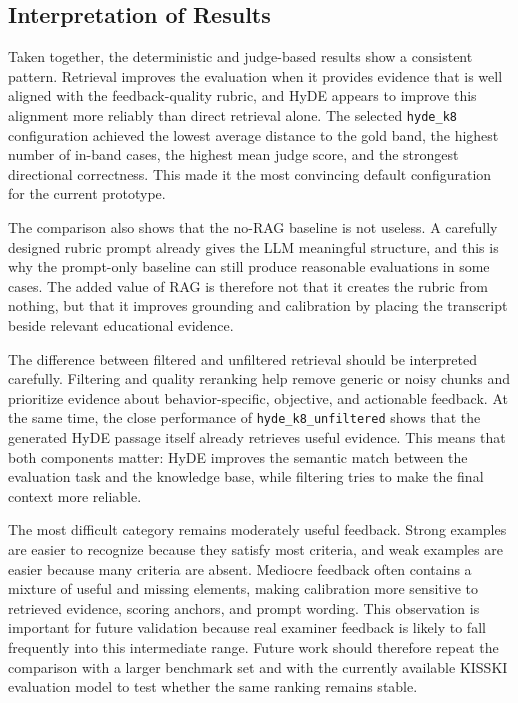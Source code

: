 \subsection{Interpretation of Results}
Taken together, the deterministic and judge-based results show a consistent
pattern. Retrieval improves the evaluation when it provides evidence that is
well aligned with the feedback-quality rubric, and HyDE appears to improve this
alignment more reliably than direct retrieval alone. The selected
\texttt{hyde\_k8} configuration achieved the lowest average distance to the
gold band, the highest number of in-band cases, the highest mean judge score,
and the strongest directional correctness. This made it the most convincing
default configuration for the current prototype.

The comparison also shows that the no-RAG baseline is not useless. A carefully
designed rubric prompt already gives the LLM meaningful structure, and this is
why the prompt-only baseline can still produce reasonable evaluations in some
cases. The added value of RAG is therefore not that it creates the rubric from
nothing, but that it improves grounding and calibration by placing the
transcript beside relevant educational evidence.

The difference between filtered and unfiltered retrieval should be interpreted
carefully. Filtering and quality reranking help remove generic or noisy chunks
and prioritize evidence about behavior-specific, objective, and actionable
feedback. At the same time, the close performance of
\texttt{hyde\_k8\_unfiltered} shows that the generated HyDE passage itself
already retrieves useful evidence. This means that both components matter: HyDE
improves the semantic match between the evaluation task and the knowledge base,
while filtering tries to make the final context more reliable.

The most difficult category remains moderately useful feedback. Strong examples
are easier to recognize because they satisfy most criteria, and weak examples
are easier because many criteria are absent. Mediocre feedback often contains a
mixture of useful and missing elements, making calibration more sensitive to
retrieved evidence, scoring anchors, and prompt wording. This observation is
important for future validation because real examiner feedback is likely to fall
frequently into this intermediate range. Future work should therefore repeat
the comparison with a larger benchmark set and with the currently available
KISSKI evaluation model to test whether the same ranking remains stable.
